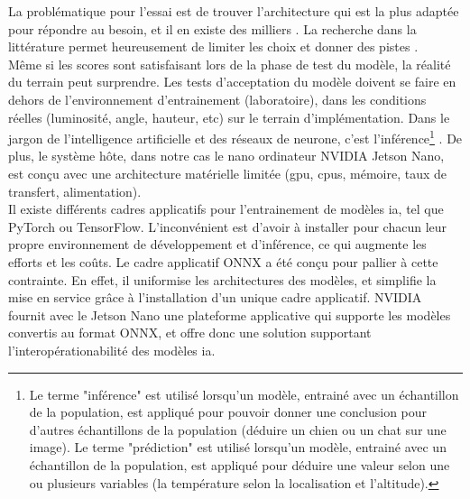 \begin{comment}
Par exemple l'architecture "VGG" prend 2-3 semaines d'entrainement \parencite{simonyan_very_2015} avec 4 \acrshort{gpu} Titan Black (NVIDIA), coutant 1,200 \$US (Amazon.com) chacun (pour un total de 4,800\$US, et cela juste pour les \acrshort{gpu}s, qui ne sont qu'un des éléments de l'infrastructure nécessaire). Étant donné que de multiples tentatives sont nécessaires (cycles essai-erreur), la stratégie est d'entrainer plusieurs modèles en parallèle afin d'accélérer le développement, ce qui implique un cout élevé en infrastructure.
\end{comment}
La problématique pour l'essai est de trouver l'architecture qui est la plus adaptée pour répondre au besoin, et il en existe des milliers \parencite{koh_model_2018}. La recherche dans la littérature permet heureusement de limiter les choix et donner des pistes \parencite{zheng_real-time_2020, nguyen_mavnet_2019, nvidia_jetson_2019-1}. 
\vspace{\baselineskip}
\\
\noindent Même si les scores sont satisfaisant lors de la phase de test du modèle, la réalité du terrain peut surprendre. Les tests d'acceptation du modèle doivent se faire en dehors de l'environnement d'entrainement (laboratoire), dans les conditions réelles (luminosité, angle, hauteur, etc) sur le terrain d'implémentation. Dans le jargon de l'intelligence artificielle et des réseaux de neurone, c'est l'inférence\footnote{Le terme "inférence" est utilisé lorsqu'un modèle, entrainé avec un échantillon de la population, est appliqué pour pouvoir donner une conclusion pour d'autres échantillons de la population (déduire un chien ou un chat sur une image). Le terme "prédiction" est utilisé lorsqu'un modèle, entrainé avec un échantillon de la population, est appliqué pour déduire une valeur selon une ou plusieurs variables (la température selon la localisation et l'altitude).} \parencite{copel_whats_2016, nvidia_jetson_2019-1}. De plus, le système hôte, dans notre cas le nano ordinateur NVIDIA Jetson Nano, est conçu avec une architecture matérielle limitée (\acrshort{gpu}, \acrshort{cpu}s, mémoire, taux de transfert, alimentation). 
\vspace{\baselineskip}
\\
\noindent Il existe différents cadres applicatifs pour l'entrainement de modèles \acrshort{ia}, tel que PyTorch ou TensorFlow. L'inconvénient est d'avoir à installer pour chacun leur propre environnement de développement et d'inférence, ce qui augmente les efforts et les coûts. Le cadre applicatif ONNX a été conçu pour pallier à cette contrainte. En effet, il uniformise les architectures des modèles, et simplifie la mise en service grâce à l'installation d'un unique cadre applicatif. NVIDIA fournit avec le Jetson Nano une plateforme applicative qui supporte les modèles convertis au format ONNX, et offre donc une solution supportant l'interopérationabilité des modèles \acrshort{ia}. 